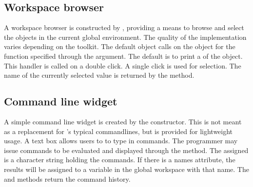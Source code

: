\subsection{Workspace browser}
\label{sec:gWidgets-workspace-browser}

A workspace browser is constructed by , providing a
means to browse and select the objects in the current global environment. The
quality of the implementation varies depending on the toolkit. The
default  object calls  on the object for
the function specified through the 
argument. The default is to print a  of the object. This
handler is called on a double click. A single click is used for
selection. The name of the currently selected value is returned by the
 method.






\subsection{Command line widget}
\label{sec:gWidgets-command-line-widget}

A simple command line widget is created by the
 constructor. This is not meant as a
replacement for \R's typical commandlines, but is provided for
lightweight usage. A text box allows users to to type in \R\/
commands. The programmer may issue commands to be evaluated and
displayed through the  method. The
 assigned is a character string holding the commands. If
there is a names attribute, the results will be assigned to a variable
in the global workspace with that name. The  and \code{[}
methods return the command history.


